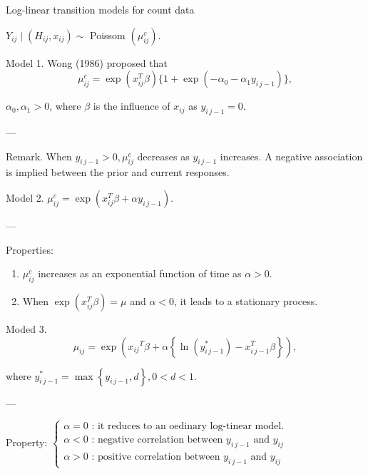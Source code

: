 \documentclass[UTF8,a4paper,10pt]{article}
\begin{document}
\begin{Problem}[]{Log-linear transition models for count data}


 
$Y_{ij} \mid\left(H_{ij}, x_{ij}\right) \sim$ Poissom $\left(\mu^c_{ij}\right)$.

\dotfill

Model 1. Wong (1986) proposed that $$\mu_{ij}^c=\exp \left(x_{ij}^T\beta\right) \{1+\exp \left(-\alpha_0-\alpha_1 y_{i\,j-1}\right)\},$$ 

$\alpha_0, \alpha_1>0$, where $\beta$ is the influence of $x_{ij}$ as $y_{i\,j-1}=0$.

---

Remark. When $y_{i\,j-1}>0, \mu_{ij}^c$ decreases as $y_{i\,j-1}$ increases. A negative association is implied between the prior and current responses.

\dotfill

Model 2. $\mu_{ij}^c=\exp \left(x_{ij}^T\beta+\alpha y_{i\,j-1}\right)$.

---

Properties: 
\begin{enumerate}
  \item $\mu_{ij}^c$ increases as an exponential function of time as $\alpha>0$.
  \item When $\exp \left(x_{ij}^T \beta\right)=\mu$ and $\alpha<0$, it leads to a stationary process.
\end{enumerate}


\dotfill


Moded 3. $$\mu_{ij}=\exp \left(x_{ij}{ }^T \beta+\alpha\left\{\ln \left(y_{i\,j-1}^*\right)-x_{i\,j-1}^T \beta\right\}\right),$$ 

where $y_{i\,j-1}^*=\max \left\{y_{i\,j-1}, d\right\}, 0<d<1$.

---

Property: $\left\{\begin{array}{l}\alpha=0 \text { : it reduces to an oedinary log-tinear model. } \\ \alpha<0 \text { : negative correlation between } y_{i\,j-1} \text { and } y_{ij} \\ 
  \alpha>0 \text { : positive correlation between } y_{i\,j-1} \text { and } y_{ij}\end{array}\right.$


\end{Problem}


\begin{equation*}
  \begin{aligned}
  \end{aligned}
\end{equation*}
\end{document}
